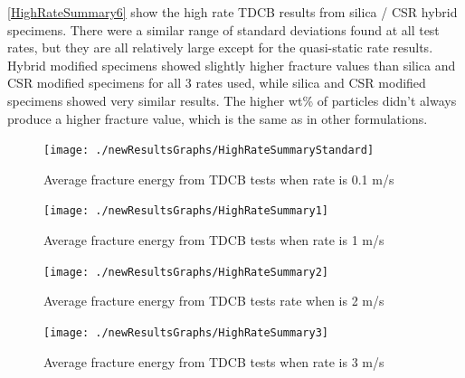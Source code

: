 \documentclass[numbers=noendperiod,chapterprefix=on]{icldt} %
\begin{document}
\ref{HighRateSummary6} show the high rate TDCB results from 
silica / CSR hybrid specimens. There were a similar range of standard deviations found at all test rates, but they are all relatively large except for the quasi-static rate results. 
Hybrid modified specimens showed slightly higher fracture values than silica and CSR modified specimens for all 3 rates used, while silica and CSR modified specimens showed very similar results. The higher wt\% of particles didn't always produce a higher fracture value, which is the same as in other formulations. 


\begin{figure}[!htpb]
\centering
\texttt{[image: ./newResultsGraphs/HighRateSummaryStandard]}
\caption{Average fracture energy from TDCB tests when rate is 0.1 m/s} \label{HighRateSummaryStandard}
\end{figure}
\FloatBarrier
  
\begin{figure}[!htpb]
\centering
\texttt{[image: ./newResultsGraphs/HighRateSummary1]}
\caption{Average fracture energy from TDCB tests when rate is 1 m/s} \label{HighRateSummary1}
\end{figure}
\FloatBarrier


\begin{figure}[!htpb]
\centering
\texttt{[image: ./newResultsGraphs/HighRateSummary2]}
\caption{Average fracture energy from TDCB tests rate when is 2 m/s} \label{HighRateSummary2}
\end{figure}
\FloatBarrier


\begin{figure}[!htpb]
\centering
\texttt{[image: ./newResultsGraphs/HighRateSummary3]}
\caption{Average fracture energy from TDCB tests when rate is 3 m/s} \label{HighRateSummary3}
\end{figure}
\FloatBarrier
\end{document}

